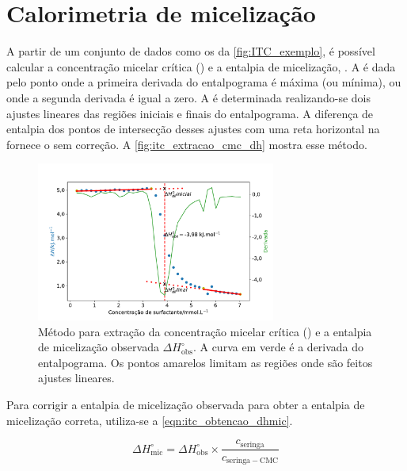 		\FloatBarrier
		
		\section{Calorimetria de micelização} 
		\label{sec:calorimetria_micelizacao}
		A partir de um conjunto de dados como os da \autoref{fig:ITC_exemplo}, é possível calcular a concentração micelar crítica (\cmc) e a entalpia de micelização, \DHmic. A \cmc{} é dada pelo ponto onde a primeira derivada do entalpograma é máxima (ou mínima)\cite{Bouchemal2010a}, ou onde a segunda derivada é igual a zero.\cite{Sarac2009}  A \DHmic{} é determinada realizando-se dois ajustes lineares das regiões iniciais e finais do entalpograma.\cite{Olofsson2009a, Loh2016} A diferença de entalpia dos pontos de intersecção desses ajustes com uma reta horizontal na \cmc{} fornece o \DHmic{} sem correção.  A \autoref{fig:itc_extracao_cmc_dh} mostra esse método.
		
		\begin{figure}[h] 
			\centering
			\includegraphics[width=0.7\textwidth]{imagens/itc/extracao_cmc_dh_exemplo}
			\caption{Método para extração da concentração micelar crítica (\cmc) e a entalpia de micelização observada \(\Delta H^\circ_\mathrm{obs}\). A curva em verde é a derivada do entalpograma. Os pontos amarelos limitam as regiões onde são feitos ajustes lineares.}
			\label{fig:itc_extracao_cmc_dh}
		\end{figure} 

		Para corrigir a entalpia de micelização observada para obter a entalpia de micelização correta, utiliza-se a \autoref{eqn:itc_obtencao_dhmic}.\cite{Loh2016}  
		
		\begin{equation}
			\Delta H^\circ_{\textrm{mic}} = \Delta H^\circ_{\textrm{obs}} \times \dfrac{c_{\textrm{seringa}}}{c_{\textrm{seringa}-\mathrm{CMC}}}
			\label{eqn:itc_obtencao_dhmic}
		\end{equation}  %
		
